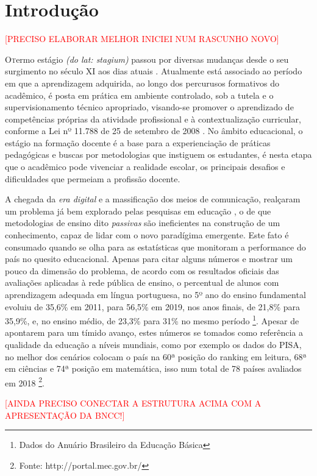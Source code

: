 \chapter{Introdução} %
\label{chap:Introdução}
\textcolor{red}{[PRECISO ELABORAR MELHOR INICIEI NUM RASCUNHO NOVO]}

\lettrine{O} termo estágio \textit{(do lat: stagium)} passou por diversas mudanças desde o seu surgimento no século XI aos dias atuais \cite{COLOMBO:2014}. Atualmente está associado ao período em que a aprendizagem  adquirida, ao longo dos percurusos formativos do acadêmico, é posta em prática em ambiente controlado, sob a tutela e o supervisionamento técnico apropriado, visando-se promover o aprendizado de competências próprias da atividade profissional e à contextualização curricular, conforme a Lei nº 11.788 de 25 de setembro de 2008 \cite{BRASIL:2008}. No âmbito educacional, o estágio na formação docente é a base para a experienciação de práticas pedagógicas e buscas por metodologias que instiguem os estudantes, é nesta etapa que o acadêmico pode vivenciar a realidade escolar, os principais desafios e dificuldades que permeiam a profissão docente.

A chegada da \textit{era digital} e a massificação dos meios de comunicação, realçaram um problema já bem explorado pelas pesquisas em educação \cite{MORAES:2018,DIESEL:2017}, o de que metodologias de ensino dito \textit{passivas} são ineficientes na construção de um conhecimento, capaz de lidar com o novo paradígima emergente. Este fato é consumado quando se olha para as estatísticas que monitoram a performance do país no quesito educacional. Apenas para citar alguns números e mostrar um pouco da dimensão do problema, de acordo com os resultados oficiais das avaliações aplicadas à rede pública de ensino, o percentual de alunos com aprendizagem adequada em língua portuguesa, no 5º ano do ensino fundamental evoluiu de 35,6\% em 2011, para 56,5\% em 2019, nos anos finais, de 21,8\% para 35,9\%, e, no ensino médio, de 23,3\% para 31\% no mesmo período \footnote{Dados do Anuário Brasileiro da Educação Básica}. Apesar de apontarem para um tímido avanço, estes números se tomados como referência a qualidade da educação a níveis	mundiais, como por exemplo os dados do \ac{PISA}, no melhor dos cenários colocam o país na 60ª posição do ranking em leitura, 68ª em ciências e 74ª posição em matemática, isso num total de 78 países avaliados em 2018 \footnote{Fonte: http://portal.mec.gov.br/}.

\textcolor{red}{[AINDA PRECISO CONECTAR A ESTRUTURA ACIMA COM A APRESENTAÇÃO DA BNCC!]}

